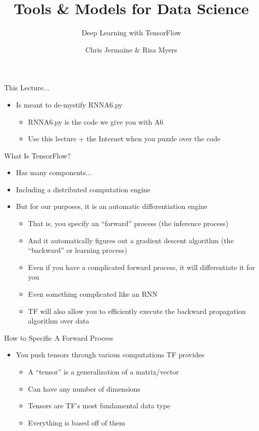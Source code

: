 \documentclass[aspectratio=169]{beamer}
\title[]
{Tools \& Models for Data Science}
\subtitle{Deep Learning with TensorFlow}
\author[]{Chris Jermaine \& Risa Myers}
\institute
{
  Rice University 
}
\date[]{}
\begin{document}
\begin{frame}
 \titlepage
\end{frame}
\begin{frame}{This Lecture...}

\begin{itemize}
        \item Is meant to de-mystify RNNA6.py
        \begin{itemize}
	\item RNNA6.py is the code we give you with A6
        \item Use this lecture + the Internet when you puzzle over the code
        \end{itemize}

\end{itemize}
\end{frame}
\begin{frame}{What Is TensorFlow?}

\begin{itemize}
	\item Has many components...
	\item Including a distributed computation engine
	\item But for our purposes, it is an automatic differentiation engine
        \begin{itemize}
                \item That is, you specify an ``forward'' process (the inference process)
		\item And it automatically figures out a gradient descent algorithm (the ``backward'' or learning process)
		\item Even if you have a complicated forward process, it will differentiate it for you
		\item Even something complicated like an RNN
		\item TF will also allow you to efficiently execute the backward propagation algorithm over data
        \end{itemize}
\end{itemize}

\end{frame}
\begin{frame}{How to Specific A Forward Process}

\begin{itemize}
\item You push tensors through various computations TF provides
	\begin{itemize}
	\item A ``tensor'' is a generalization of a matrix/vector
	\item Can have any number of dimensions 
	\item Tensors are TF's most fundamental data type
	\item Everything is based off of them
	\end{itemize}
\end{itemize}
\end{frame}
\end{document}
